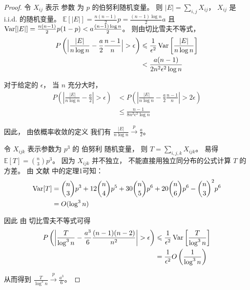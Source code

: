 \begin{proof}
		令 $X_{ij}$ 表示
    参数 为 $p$ 的伯努利随机变量。
     则 $|E|
    = \sum_{i,j} X_{ij}$， $X_{ij}$ 是 i.i.d.
    的随机变量。
	$\mathbb{E}[|E|] = \frac{n(n-1)}{2}p = \frac{(n-1)\log n}{2}a$ 
  且  $\operatorname{\mathrm{Var}}[|E|] = \frac{n(n-1)}{2} p(1-p) < a\frac{(n-1)\log n}{2}$。
	则由切比雪夫不等式，
	\begin{align*}
	P\left(\Big|\frac{|E|}{n \log n } - \frac{a}{2} \frac{n-1}{n}\Big| > \epsilon \right) & \leqslant
	\frac{1}{\epsilon^2}\operatorname{\mathrm{Var}} \left[\frac{|E| } {n \log n } \right] \\
	& < \frac{a(n-1)}{2n^2\epsilon^2\log n}
	\end{align*}
	
	对于给定的 $\epsilon$， 当 $n$ 充分大时，
  \begin{align*}
	P \left(\left|\frac{|E|}{n \log n } - \frac{a}{2} \right| > \epsilon \right) & <
	P \left(\left|\frac{|E|}{n \log n } - \frac{a}{2} \frac{n-1}{n}\right| > 2\epsilon \right) \\
	& \leq \frac{n-1}{8n^2 \epsilon^2 \log n}
	\end{align*}
	
	因此， 由依概率收敛的定义
  我们有 $\frac{|E|}{n \log n} \xrightarrow{p} \frac{a}{2}$。
	
	令 $X_{ijk}$ 表示参数为  $p^3$ 的 伯努利 随机变量，
	则 $T = \sum_{i,j,k} X_{ijk}$。
	易得 $\mathbb{E}[T] = \binom{n}{3}p^3$。
  因为 $X_{ijk}$ 并不独立，
  不能直接用独立同分布的公式计算 $T$ 的方差。
	由 文献  中的定理1可知：
	\begin{align*}
	\operatorname{\mathrm{Var}}[T]  &= \binom{n}{3} p^3 + 12 \binom{n}{4} p^5 + 30 \binom{n}{5} p^6 + 20 \binom{n}{6} p^6
	 - \binom{n}{3}^2 p^6  \\ 
   &= O(\log^3 n)
	\end{align*}
	
	因此
	由 切比雪夫不等式可得
	\begin{align*}
	P \left (\left|\frac{T}{\log^3 n } - \frac{a^3}{6} \frac{(n-1)(n-2)}{n^2}\right| > \epsilon \right)
   &\leqslant \frac{1}{\epsilon^2} \operatorname{\mathrm{Var}} \left[ \frac{T}{\log^3 n} \right]\\ 
	& = \frac{1}{\epsilon^2}O \left(\frac{1}{\log^3 n} \right)
	\end{align*}
	    
	从而得到 $\frac{T}{\log^3 n} \xrightarrow{p} \frac{a^3}{6}$。
\end{proof}
